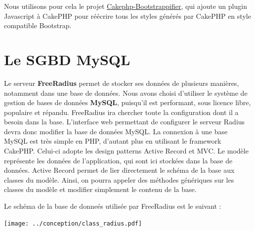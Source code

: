 \documentclass[10pt]{article}
\begin{document}
Nous utilisons pour cela le projet \href{https://github.com/mtkocak/Cakephp-Bootstrappifier}{Cakephp-Bootstrappifier}, qui ajoute un plugin Javascript à CakePHP pour réécrire tous les styles générés par CakePHP en style compatible Bootstrap.


\newpage
\section{Le SGBD MySQL}

Le serveur \textbf{FreeRadius} permet de stocker ses données de plusieurs manières, notamment dans une base de données. Nous avons choisi d'utiliser le système de gestion de bases de données \textbf{MySQL}, puisqu'il est performant, sous licence libre, populaire et répandu. FreeRadius ira chercher toute la configuration dont il a besoin dans la base. L'interface web permettant de configurer le serveur Radius devra donc modifier la base de données MySQL.
La connexion à une base MySQL est très simple en PHP, d'autant plus en utilisant le framework CakePHP. Celui-ci adopte les design patterns Active Record et MVC. Le modèle représente les données de l'application, qui sont ici stockées dans la base de données. Active Record permet de lier directement le schéma de la base aux classes du modèle. Ainsi, on pourra appeler des méthodes génériques sur les classes du modèle et modifier simplement le contenu de la base.


Le schéma de la base de donneés utilisée par FreeRadius est le suivant :


\texttt{[image: ../conception/class\_radius.pdf]}
\end{document}
